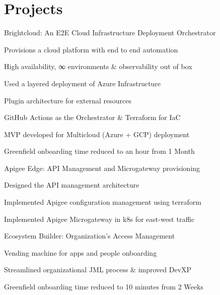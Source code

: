 \documentclass[]{de-resume}
\begin{document}
\hfill
\begin{minipage}[t]{0.66\textwidth} 
\section{Projects}
\subsectionsep
 \subsectionsep
 \begin{tightemize}
 \item Brightcloud: An E2E Cloud Infrastructure Deployment Orchestrator
 	\begin{tightemize}
 		\sectionsep
 		\item Provisions a cloud platform with end to end automation
 		\item High availability, ∞ environments \& observability out of box
 		\item Used a layered deployment of Azure Infrastructure
 		\item Plugin architecture for external resources
 		\item GitHub Actions as the Orchestrator \& Terraform for IaC 
 		\item MVP developed for Multicloud (Azure + GCP) deployment 
 		\item Greenfield onboarding time reduced to an hour from 1 Month
 		\sectionsep
 	\end{tightemize}

 \item Apigee Edge: API Management and Microgateway provisioning 
 \begin{tightemize}
 	\sectionsep
 	\item Designed the API management architecture
 	\item Implemented Apigee configuration management using terraform
 	\item Implemented Apigee Microgateway in k8s for east-west traffic
 	\sectionsep
 \end{tightemize}

 \item Ecosystem Builder: Organization's Access Management
 \begin{tightemize}
 	\sectionsep
 	\item Vending machine for apps and people onboarding
 	\item Streamlined organizational JML process \& improved DevXP
 	\item Greenfield onboarding time reduced to 10 minutes from 2 Weeks
 	\sectionsep
 \end{tightemize}


\end{tightemize}
\end{minipage}
\end{document}
